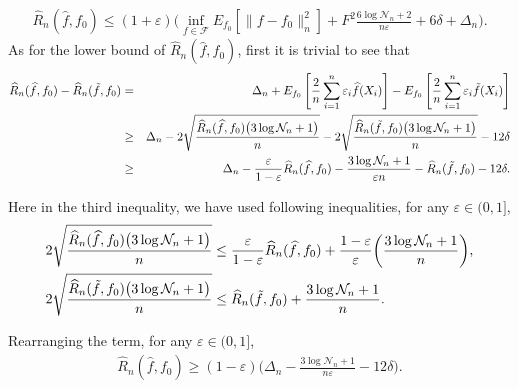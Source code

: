 \documentclass{article}
\theoremstyle{definition}
\begin{document}
\begin{eqnarray*}
    \widehat{R}_{n}(\widehat{f},f_{0}) \leq 
    (1+\varepsilon) \bigg( \inf_{f \in \mathcal{F} }E_{f_{0}}[\|f-f_{0}\|_{n}^{2}] + F^{2}\frac{ 6\log\mathcal{N}_{n}+2 }{n\varepsilon}+6\delta + \Delta_{n} \bigg).
\end{eqnarray*}
As for the lower bound of $\widehat{R}_{n}(\widehat{f},f_{0})$, first it is trivial to see that 
\begin{eqnarray*}
    \widehat{R}_{n}(\widehat{f},f_{0}) - \widehat{R}_{n}(\Tilde{f},f_{0}) &=& 
    \Delta_{n} + E_{f_{0}}\left[ \frac{2}{n} \sum_{i=1}^{n} \varepsilon_{i} \widehat{f}(X_{i}) \right] - E_{f_{0}}\left[ \frac{2}{n} \sum_{i=1}^{n} \varepsilon_{i} \Tilde{f}(X_{i}) \right] \\
    &\geq&  \Delta_{n} - 2\sqrt{\frac{\widehat{R}_{n}(\widehat{f},f_{0})\big( 3\log\mathcal{N}_{n}+1 \big)}{n}} - 2\sqrt{\frac{\widehat{R}_{n}(\Tilde{f},f_{0})\big( 3\log\mathcal{N}_{n}+1 \big)}{n}} -12\delta \\
    &\geq&  \Delta_{n} - \frac{\varepsilon}{1-\varepsilon}\widehat{R}_{n}(\widehat{f},f_{0}) - \frac{3\log\mathcal{N}_{n}+1}{\varepsilon n} - \widehat{R}_{n}(\Tilde{f},f_{0})-12\delta.
\end{eqnarray*}

Here in the third inequality, we have used following inequalities, for any $\varepsilon\in(0,1]$,
\begin{align*}
    &2\sqrt{\frac{\widehat{R}_{n}(\widehat{f},f_{0})\big( 3\log\mathcal{N}_{n}+1 \big)}{n}}
    \leq \frac{\varepsilon}{1-\varepsilon}\widehat{R}_{n}(\widehat{f},f_{0}) + \frac{1-\varepsilon}{\varepsilon}\bigg(\frac{3\log\mathcal{N}_{n}+1}{n}\bigg),\\
    &2\sqrt{\frac{\widehat{R}_{n}(\Tilde{f},f_{0})\big( 3\log\mathcal{N}_{n}+1 \big)}{n}}
    \leq \widehat{R}_{n}(\Tilde{f},f_{0}) + \frac{3\log\mathcal{N}_{n}+1}{n}.\\
\end{align*}

Rearranging the term, for any $\varepsilon\in(0,1]$,
\begin{eqnarray*}
    \widehat{R}_{n}(\widehat{f},f_{0}) \geq (1-\varepsilon)\bigg( \Delta_{n} -\frac{3\log\mathcal{N}_{n}+1}{n\varepsilon} -12\delta \bigg).
\end{eqnarray*}
\end{document}
